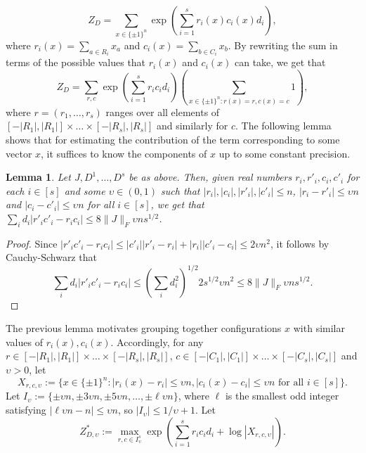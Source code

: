 \documentclass[final, 12pt]{colt2018}
\newtheorem{lemma}[theorem]{Lemma}
\theoremstyle{definition}
\theoremstyle{plain}
\begin{document}
\[
Z_{D}=\sum_{x\in\{\pm1\}^{n}}\exp\left(\sum_{i=1}^{s}r_{i}(x)c_{i}(x)d_{i}\right),
\]
where $r_{i}(x)=\sum_{a\in R_{i}}x_{a}$ and $c_{i}(x)=\sum_{b\in C_{i}}x_{b}$.
By rewriting the sum in terms of the possible values that $r_{i}(x)$
and $c_{i}(x)$ can take, we get that 
\begin{equation}
\label{eqn:partition-function-cut}
Z_{D}=\sum_{r,c}\exp\left(\sum_{i=1}^{s}r_{i}c_{i}d_{i}\right)\left(\sum_{x\in\{\pm1\}^{n}:r(x)=r,c(x)=c}1\right),
\end{equation}
where $r=(r_{1},\dots,r_{s})$ ranges over all elements of $[-|R_{1}|,|R_{1}|]\times\dots\times[-|R_{s}|,|R_{s}|]$
and similarly for $c$. The following lemma shows that for estimating the contribution of the term corresponding to some vector $x$, it suffices to know the components of $x$ up to some constant precision. 
\begin{lemma}\label{lemma:gamma-def}
Let $J, D^{1},\dots,D^{s}$ be as above. Then, given real numbers $r_{i},r'_{i},c_{i},c'_{i}$ for each $i\in[s]$ and some 
$\upsilon \in (0,1)$ such that $|r_i|,|c_i|,|r'_i|,|c'_i| \le n$, 
$|r_i - r'_i| \le \upsilon n$ and $|c_i - c'_i| \le \upsilon n$ 
for all $i\in[s]$, we get that 
$\sum_i d_i|r'_i c'_i - r_i c_i| \le 8\|J\|_F\upsilon ns^{1/2}$. 
\end{lemma}
\begin{proof}
Since $ |r'_i c'_i - r_i c_i| \le |c'_i||r'_i - r_i| + |r_i||c'_i - c_i| \le 2\upsilon n^2$, it follows by Cauchy-Schwarz that
\[ \sum_i d_i|r'_i c'_i - r_i c_i|
\le \left(\sum_i d_i^2\right)^{1/2} 2s^{1/2}\upsilon n^2
\le  8\|J\|_F\upsilon ns^{1/2}. \]
\end{proof}

The previous lemma motivates grouping together configurations $x$ with similar values of $r_i(x),c_i(x)$. Accordingly, for any $r \in [-|R_1|,|R_1|]\times\dots\times[-|R_s|,|R_s|]$, $c \in [-|C_1|,|C_1|]\times\dots\times[-|C_s|,|C_s|]$ and $\upsilon > 0$, let 
$$X_{r,c,\upsilon}:= \{x\in \{\pm1\}^{n}: |r_i(x)-r_i| \leq \upsilon n, |c_i(x)-c_i| \leq \upsilon n \text{ for all } i\in [s]\}.$$ 
Let $I_\upsilon := \{\pm\upsilon n, \pm 3\upsilon n,\pm 5\upsilon n,\dots,\pm\ell \upsilon n\}$, where $\ell$ is the smallest odd integer satisfying $|\ell \upsilon n - n| \leq \upsilon n$, so $|I_{\upsilon}| \le 1/\upsilon + 1$. Let 
\begin{equation}
\label{eqn:intermediate-var-problem}
Z_{D,\upsilon}^{*}:=\max_{r,c\in I_{\upsilon}^{s}}\exp\left(\sum_{i=1}^{s}r_{i}c_{i}d_{i}+\log|X_{r,c,\upsilon}|\right).
\end{equation}
\end{document}
